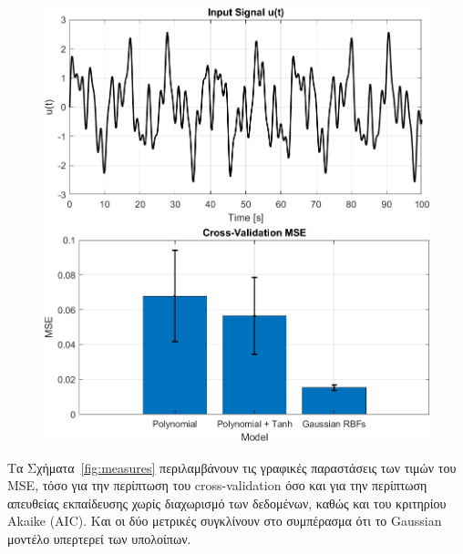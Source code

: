 \documentclass[12pt]{article} %
\numberwithin{equation}{section}  %
\begin{document}
\begin{figure}[ht!]
    \centering
    \begin{minipage}{0.49\textwidth}
        \centering
        \includegraphics[width=0.9\linewidth]{plots/plotB_12_input.png}
    \end{minipage}
    \hfill
    \begin{minipage}{0.49\textwidth}
        \centering
        \includegraphics[width=0.9\linewidth]{plots/plotB_10_cv_mse.png}
    \end{minipage}
    
    \caption{}
    \label{fig:plt1}
\end{figure}

Τα Σχήματα~\ref{fig:measures} περιλαμβάνουν τις γραφικές παραστάσεις των τιμών του MSE, 
τόσο για την περίπτωση του cross-validation όσο και για την περίπτωση απευθείας εκπαίδευσης χωρίς διαχωρισμό των δεδομένων, 
καθώς και του κριτηρίου Akaike (AIC). 
Και οι δύο μετρικές συγκλίνουν στο συμπέρασμα ότι το Gaussian μοντέλο υπερτερεί των υπολοίπων.
\end{document}

